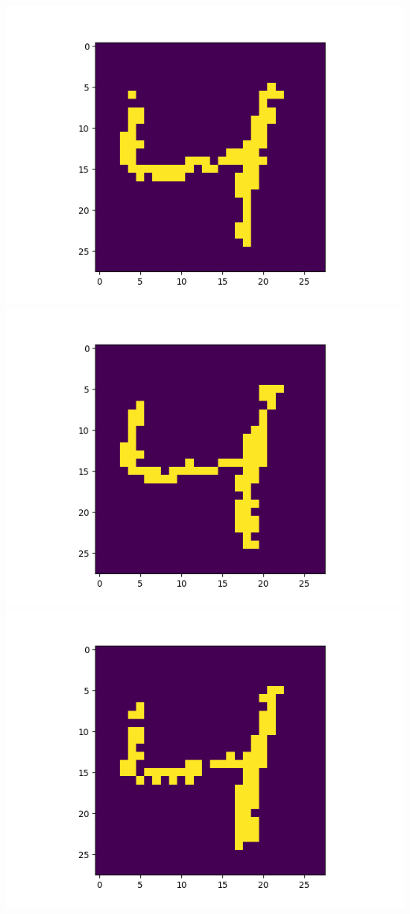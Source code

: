 \includegraphics[scale=0.2]{./bilder/comparison/prob/22}
\includegraphics[scale=0.2]{./bilder/comparison/prob/23}
\includegraphics[scale=0.2]{./bilder/comparison/prob/24}
